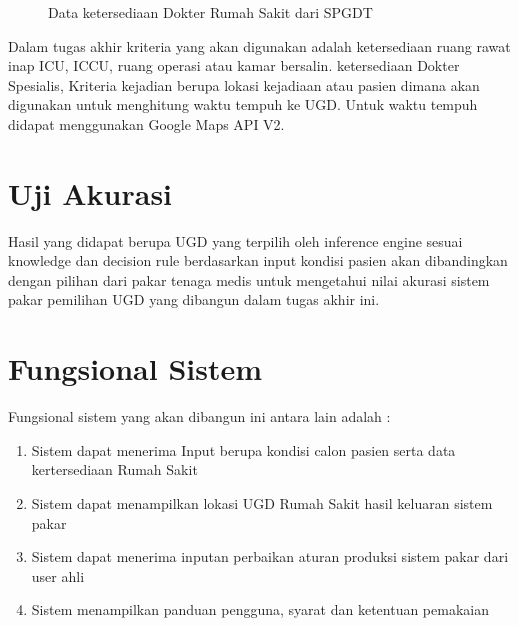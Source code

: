 \begin{figure}[h]	
	{\centering {}\par}
	\caption{Data ketersediaan Dokter Rumah Sakit dari SPGDT}
	\label{fig:dataDok}
\end{figure}

\par Dalam tugas akhir kriteria yang akan digunakan adalah ketersediaan ruang rawat inap ICU, ICCU, ruang operasi atau kamar bersalin. ketersediaan Dokter Spesialis, Kriteria kejadian berupa lokasi kejadiaan atau pasien dimana akan digunakan untuk menghitung waktu tempuh ke UGD. Untuk waktu tempuh didapat menggunakan Google Maps API V2.

\section{Uji Akurasi}
Hasil yang didapat berupa UGD yang terpilih oleh inference engine sesuai knowledge dan decision rule berdasarkan input kondisi pasien akan dibandingkan dengan pilihan dari pakar tenaga medis untuk mengetahui nilai akurasi sistem pakar pemilihan UGD yang dibangun dalam tugas akhir ini.

\section{Fungsional Sistem}
Fungsional sistem yang akan dibangun ini antara lain adalah :
\begin{enumerate}
	\item Sistem dapat menerima Input berupa kondisi calon pasien serta data kertersediaan Rumah Sakit
	\item Sistem dapat menampilkan lokasi UGD Rumah Sakit hasil keluaran sistem pakar
	\item Sistem dapat menerima inputan perbaikan aturan produksi sistem pakar dari user ahli
	\item Sistem menampilkan panduan pengguna, syarat dan ketentuan pemakaian
\end{enumerate}

